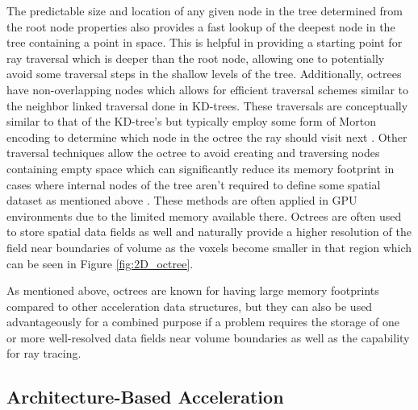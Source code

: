The predictable size and location of any given node in the tree determined from
the root node properties also provides a fast lookup of the deepest node in the
tree containing a point in space. This is helpful in providing a starting point
for ray traversal which is deeper than the root node, allowing one to
potentially avoid some traversal steps in the shallow levels of the
tree. Additionally, octrees have non-overlapping nodes which allows for
efficient traversal schemes similar to the neighbor linked traversal done in
KD-trees. These traversals are conceptually similar to that of the KD-tree's but
typically employ some form of Morton encoding to determine which node in the
octree the ray should visit next \cite{Revelles_2000}. Other traversal
techniques allow the octree to avoid creating and traversing nodes containing
empty space which can significantly reduce its memory footprint in cases where
internal nodes of the tree aren't required to define some spatial dataset as
mentioned above \cite{Samet_1989}. These methods are often applied in GPU
environments due to the limited memory available there. Octrees are often used
to store spatial data fields as well and naturally provide a higher resolution
of the field near boundaries of volume as the voxels become smaller in that
region which can be seen in Figure \ref{fig:2D_octree}.

As mentioned above, octrees are known for having large memory footprints
compared to other acceleration data structures, but they can also be used
advantageously for a combined purpose if a problem requires the storage of one
or more well-resolved data fields near volume boundaries as well as the
capability for ray tracing.

\subsection{Architecture-Based Acceleration}%
\label{subsec:arch}


